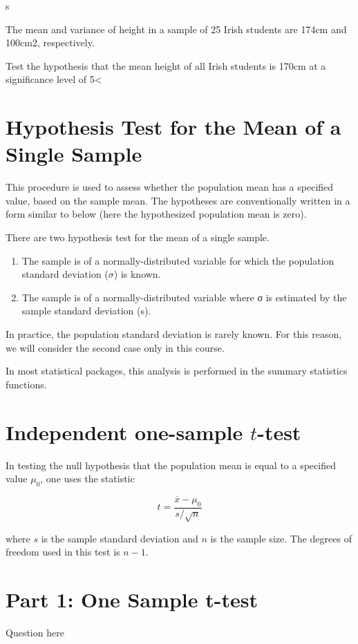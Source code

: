 s\documentclass[]{report}
\begin{document}
The mean and variance of height in a sample of 25 Irish students are 174cm and 100cm2, respectively.

Test the hypothesis that the mean height of all Irish students is 170cm at a significance level of 5<%

\section{Hypothesis Test for the Mean of a Single Sample}

This procedure is used to assess whether the population mean  has a specified value, based on the sample mean. The hypotheses are conventionally written in a form similar to below (here the hypothesized population mean is zero).



There are two hypothesis test for the mean of a single sample.

\begin{enumerate}
\item The sample is of a normally-distributed variable for which the population standard deviation ($\sigma$) is known. 
\item The sample is of a normally-distributed variable where σ is estimated by the sample standard deviation (s).
\end{enumerate} 
In practice, the population standard deviation is rarely known. For this reason, we will consider the second case only in this course.

In most statistical packages, this analysis is performed in the summary statistics functions.

\section{Independent one-sample $t$-test}
In testing the null hypothesis that the population mean is equal to a specified value $\mu_{0}$, one uses the statistic

\begin{equation}t = \frac{\overline{x} - \mu_0}{s / \sqrt{n}}\end{equation}

where $s$ is the sample standard deviation and $n$ is the sample size. The degrees of freedom used in this test is $n - 1$.



\section*{Part 1: One Sample t-test}
Question here
\end{document}
